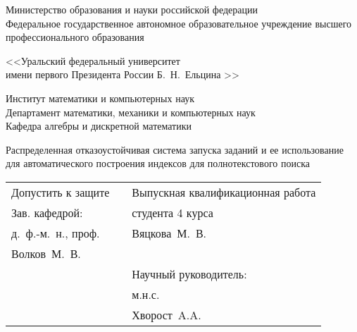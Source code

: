 \begin{titlepage}

\begin{center}
	\fontsize{8}{8}
	\selectfont

	Министерство образования и науки российской федерации \\
	Федеральное государственное автономное образовательное учреждение высшего профессионального образования \\
	
\end{center}	


\begin{center}
	\fontsize{12}{12}
	\bfseries
	\selectfont
	
	<<Уральский федеральный университет \\
	имени первого Президента России Б.~Н.~Ельцина >>\\
	
\end{center}	


\begin{center}
	\fontsize{14}{14}
	\bfseries
	\selectfont
	
	Институт математики и компьютерных наук \\
	Департамент математики, механики и компьютерных наук \\
	Кафедра алгебры и дискретной математики \\
	
\end{center}


\begin{center}
	\fontsize{20}{20}
	\bfseries
	\selectfont
	
	\par \vspace{1cm}
	
	Распределенная отказоустойчивая система запуска заданий и ее использование для автоматического построения индексов для полнотекстового поиска
	
	\par \vspace{0.5cm}
	
\end{center}


\begin{center}
	\fontsize{14}{14}
	\selectfont

	\vspace{1.0cm}
	
	\begin{tabular}{p{}p{}p{}}
		Допустить к защите && Выпускная квалификационная работа \\
		Зав. кафедрой: && студента 4 курса \\
		д.~ф.-м.~н., проф. && Вяцкова~М.~В.\\
		Волков~М.~В. && \\
		&& Научный руководитель: \\
		&& м.н.с. \\
		&& Хворост~A.A. \\
	\end{tabular}
	

\end{center}
\end{titlepage}
